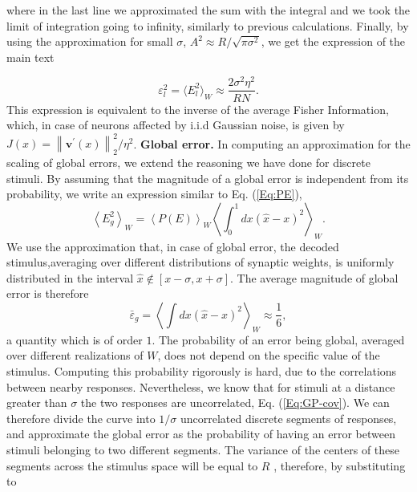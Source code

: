 \documentclass[a4paper]{article}%
\begin{document}
where in the last line we approximated the sum with the integral and we took
the limit of integration going to infinity, similarly to previous
calculations. Finally, by using the approximation for small $\sigma$, $A^{2}
\approx R/\sqrt{\pi\sigma^{2}}$, we get the expression of the main text%

\begin{equation}
\varepsilon_{l}^{2} = \langle E _{l}^{2}\rangle_{W} \approx\frac{2\sigma
^{2}\eta^{2}}{R N}.
\end{equation}
This expression is equivalent to the inverse of the average Fisher
Information, which, in case of neurons affected by i.i.d Gaussian noise, is
given by $J(x) = \left\|  \mathbf{v^{\prime}}(x)\right\|  _{2}^{2}/\eta^{2}$.
\newline\newline\textbf{Global error.} In computing an approximation for the
scaling of global errors, we extend the reasoning we have done for discrete
stimuli. By assuming that the magnitude of a global error is independent from
its probability, we write an expression similar to Eq. (\ref{Eq:PE}),
\begin{equation}
\left\langle E^{2}_{g}\right\rangle _{W} = \left\langle P(E)\right\rangle _{W}
\left\langle \int_{0}^{1} dx (\hat{x}-x)^{2}\right\rangle _{W}.
\end{equation}
We use the approximation that, in case of global error, the decoded
stimulus,averaging over different distributions of synaptic weights, is
uniformly distributed in the interval $\hat{x} \not \in [x-\sigma,x+\sigma]$.
The average magnitude of global error is therefore
\begin{equation}
\bar{\varepsilon}_{g} = \left\langle \int dx \left(  \hat{x}-x\right)
^{2}\right\rangle _{W} \approx\frac{1}{6} ,
\end{equation}
a quantity which is of order $1$. The probability of an error being global,
averaged over different realizations of $W$, does not depend on the specific
value of the stimulus. Computing this probability rigorously is hard, due to
the correlations between nearby responses. Nevertheless, we know that for
stimuli at a distance greater than $\sigma$ the two responses are
uncorrelated, Eq. (\ref{Eq:GP-cov}). We can therefore divide the curve into
$1/\sigma$ uncorrelated discrete segments of responses, and approximate the
global error as the probability of having an error between stimuli belonging
to two different segments. The variance of the centers of these segments
across the stimulus space will be equal to $R$ , therefore, by substituting to
\end{document}
